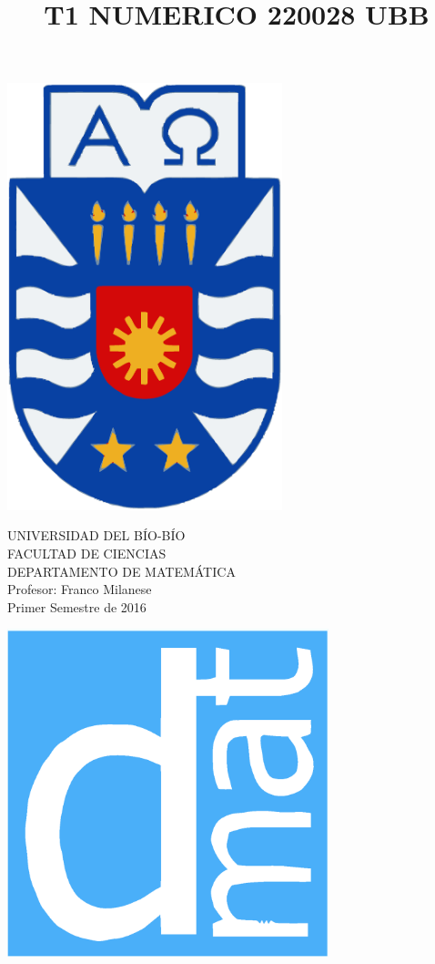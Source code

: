 \documentclass[11pt]{article}
\begin{document}
\title{T1 NUMERICO 220028 UBB}

{\begin{minipage}{2cm}
\hspace*{1cm}\includegraphics[width=0.6\textwidth]{escubo-ubb.eps}
\end{minipage}
\begin{minipage}{12cm}
\small
{\bf \rm 
{
\begin{center}
{\footnotesize UNIVERSIDAD DEL B\'IO-B\'IO} \\
{\scriptsize FACULTAD DE CIENCIAS}  \\
{\scriptsize DEPARTAMENTO DE MATEM\'ATICA}  \\
{\scriptsize Profesor:  Franco Milanese}\\
{\scriptsize Primer Semestre de 2016}
\end{center}
}}
\end{minipage}}
{\begin{minipage}{2cm}
\hspace*{-0.5cm}\vspace*{-0.05cm}\includegraphics[width=0.7\textwidth]{escudo-dmat.eps}
\end{minipage}}
\end{document}

